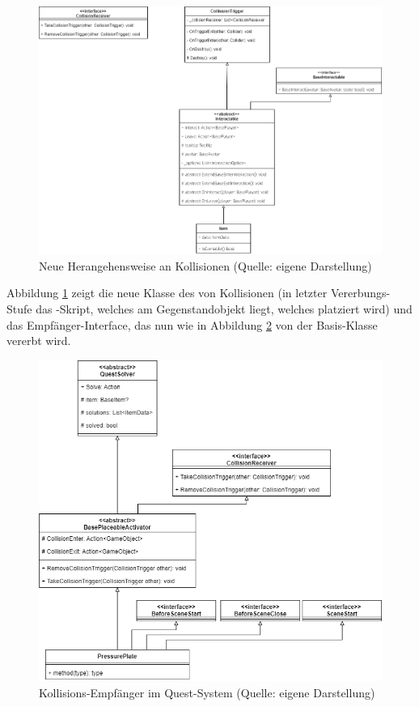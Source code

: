 \begin{figure}[ht]
\centering
\includegraphics[width=1\linewidth]{content/pictures/CollisionSystem.drawio.png}
\caption{Neue Herangehensweise an Kollisionen (Quelle: eigene Darstellung)}
\label{fig:new-collision-system}
\end{figure}

Abbildung \ref{fig:new-collision-system} zeigt die neue Klasse des  von Kollisionen (in letzter Vererbungs-Stufe das -Skript, welches am Gegenstandobjekt liegt, welches platziert wird) und das Empfänger-Interface, das nun wie in Abbildung \ref{fig:new-collision-system-in-quests} von der  Basis-Klasse vererbt wird. 

\begin{figure}[ht]
\centering
\includegraphics[width=0.8\linewidth]{content/pictures/Quest-Extension.drawio.png}
\caption{Kollisions-Empfänger im Quest-System (Quelle: eigene Darstellung)}
\label{fig:new-collision-system-in-quests}
\end{figure}

